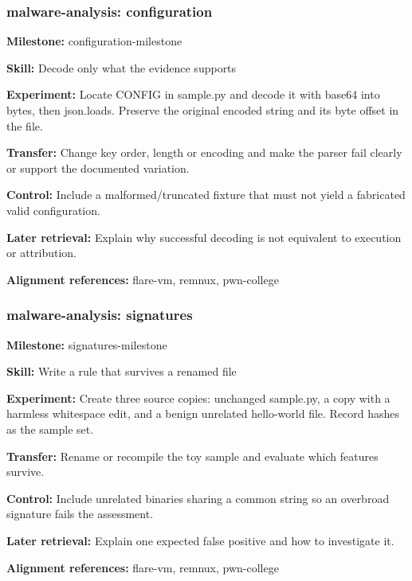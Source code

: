 \subsubsection{malware-analysis: configuration}
\noindent\textbf{Milestone:} configuration-milestone\par
\noindent\textbf{Skill:} Decode only what the evidence supports\par
\noindent\textbf{Experiment:} Locate CONFIG in sample.py and decode it with base64 into bytes, then json.loads. Preserve the original encoded string and its byte offset in the file.\par
\noindent\textbf{Transfer:} Change key order, length or encoding and make the parser fail clearly or support the documented variation.\par
\noindent\textbf{Control:} Include a malformed/truncated fixture that must not yield a fabricated valid configuration.\par
\noindent\textbf{Later retrieval:} Explain why successful decoding is not equivalent to execution or attribution.\par
\noindent\textbf{Alignment references:} flare-vm, remnux, pwn-college\par
\subsubsection{malware-analysis: signatures}
\noindent\textbf{Milestone:} signatures-milestone\par
\noindent\textbf{Skill:} Write a rule that survives a renamed file\par
\noindent\textbf{Experiment:} Create three source copies: unchanged sample.py, a copy with a harmless whitespace edit, and a benign unrelated hello-world file. Record hashes as the sample set.\par
\noindent\textbf{Transfer:} Rename or recompile the toy sample and evaluate which features survive.\par
\noindent\textbf{Control:} Include unrelated binaries sharing a common string so an overbroad signature fails the assessment.\par
\noindent\textbf{Later retrieval:} Explain one expected false positive and how to investigate it.\par
\noindent\textbf{Alignment references:} flare-vm, remnux, pwn-college\par
